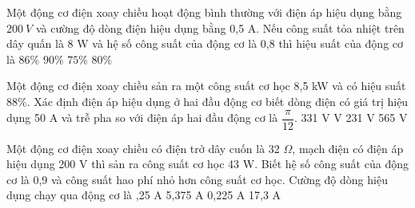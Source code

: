 \begin{vidu} %
	Một động cơ điện xoay chiều hoạt động bình thường với điện áp hiệu dụng bằng $200\ V$ và cường độ dòng điện hiệu dụng bằng 0,5 A. Nếu công suất tỏa nhiệt trên dây quấn là 8 W và hệ số công suất của động cơ là 0,8 thì hiệu suất của động cơ là
	\choice
	{$86\%$}
	{\True $90\%$}
	{$75\%$}
	{$80\%$}
\end{vidu}
\begin{vidu} %
	Một động cơ điện xoay chiều sản ra một công suất cơ học 8,5 kW và có hiệu suất 88\%. Xác định điện áp hiệu dụng ở hai đầu động cơ biết dòng điện có giá trị hiệu dụng 50 A và trễ pha so với điện áp hai đầu động cơ là $\dfrac{\pi}{12}$.
	\choice
	{331 V}
	{ V}
	{231 V}
	{565 V}
\end{vidu}
\begin{vidu} %
	Một động cơ điện xoay chiều có điện trở dây cuốn là 32 $\Omega$, mạch điện có điện áp hiệu dụng 200 V thì sản ra công suất cơ học 43 W. Biết hệ số công suất của động cơ là 0,9 và công suất hao phí nhỏ hơn công suất cơ học. Cường độ dòng hiệu dụng chạy qua động cơ là
	\choice
	{,25 A}
	{5,375 A}
	{0,225 A}
	{17,3 A}
	\loigiai{
		\begin{itemize}
			\item \noindent $UI\cos \varphi = {P_i} + {I^2}r \Rightarrow 200.I.0,9 = 43 + {I^2}.32 \Rightarrow \left[ \begin{array}{l}
			I_1 = 5,375\ A\\
			I_2 = 0,25\ A
			\end{array} \right.$
			\item \noindent Ta chọn nghiệm $I_2 = 0,25$ A vì với nghiệm thứ nhất cho công suất hao phí lớn hơn công suất có ích.
		\end{itemize} 
	}
\end{vidu}



